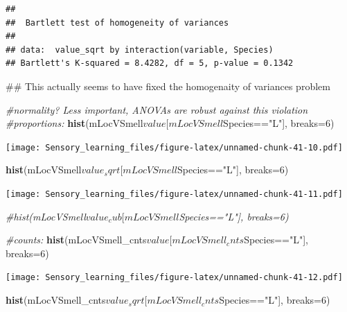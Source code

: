 \documentclass[]{article}
\newenvironment{Shaded}{\begin{snugshade}}{\end{snugshade}}
\newcommand{\KeywordTok}[1]{\textcolor[rgb]{0.13,0.29,0.53}{\textbf{{#1}}}}
\newcommand{\DataTypeTok}[1]{\textcolor[rgb]{0.13,0.29,0.53}{{#1}}}
\newcommand{\DecValTok}[1]{\textcolor[rgb]{0.00,0.00,0.81}{{#1}}}
\newcommand{\StringTok}[1]{\textcolor[rgb]{0.31,0.60,0.02}{{#1}}}
\newcommand{\CommentTok}[1]{\textcolor[rgb]{0.56,0.35,0.01}{\textit{{#1}}}}
\newcommand{\NormalTok}[1]{{#1}}
\begin{document}
\begin{verbatim}
## 
##  Bartlett test of homogeneity of variances
## 
## data:  value_sqrt by interaction(variable, Species)
## Bartlett's K-squared = 8.4282, df = 5, p-value = 0.1342
\end{verbatim}

\begin{Shaded}
\begin{Highlighting}[]
\NormalTok{## This actually seems to have fixed the homogenaity of variances problem}

\CommentTok{#normality? Less important, ANOVAs are robust against this violation}
\CommentTok{#proportions: }
\KeywordTok{hist}\NormalTok{(mLocVSmell$value[mLocVSmell$Species==}\StringTok{"L"}\NormalTok{], }\DataTypeTok{breaks=}\DecValTok{6}\NormalTok{)}
\end{Highlighting}
\end{Shaded}

\texttt{[image: Sensory\_learning\_files/figure-latex/unnamed-chunk-41-10.pdf]}

\begin{Shaded}
\begin{Highlighting}[]
\KeywordTok{hist}\NormalTok{(mLocVSmell$value_sqrt[mLocVSmell$Species==}\StringTok{"L"}\NormalTok{], }\DataTypeTok{breaks=}\DecValTok{6}\NormalTok{)}
\end{Highlighting}
\end{Shaded}

\texttt{[image: Sensory\_learning\_files/figure-latex/unnamed-chunk-41-11.pdf]}

\begin{Shaded}
\begin{Highlighting}[]
\CommentTok{#hist(mLocVSmell$value_cub[mLocVSmell$Species=="L"], breaks=6)}


\CommentTok{#counts:}
\KeywordTok{hist}\NormalTok{(mLocVSmell_cnts$value[mLocVSmell_cnts$Species==}\StringTok{"L"}\NormalTok{], }\DataTypeTok{breaks=}\DecValTok{6}\NormalTok{)}
\end{Highlighting}
\end{Shaded}

\texttt{[image: Sensory\_learning\_files/figure-latex/unnamed-chunk-41-12.pdf]}

\begin{Shaded}
\begin{Highlighting}[]
\KeywordTok{hist}\NormalTok{(mLocVSmell_cnts$value_sqrt[mLocVSmell_cnts$Species==}\StringTok{"L"}\NormalTok{], }\DataTypeTok{breaks=}\DecValTok{6}\NormalTok{)}
\end{Highlighting}
\end{Shaded}
\end{document}
